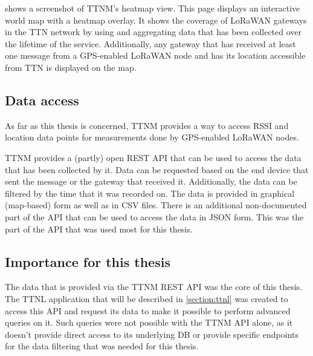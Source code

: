  shows a screenshot of \acl{TTNM}'s heatmap view.
This page displays an interactive world map with a heatmap overlay.
It shows the coverage of \ac{LoRaWAN} gateways in the \ac{TTN} network by using and aggregating data that has been collected over the lifetime of the service.
Additionally, any gateway that has received at least one message from a \ac{GPS}-enabled \ac{LoRaWAN} node and has its location accessible from \ac{TTN} is displayed on the map.

\subsection{Data access}

As far as this thesis is concerned, \acl{TTNM} provides a way to access \ac{RSSI} and location data points for measurements done by \ac{GPS}-enabled \ac{LoRaWAN} nodes.

\ac{TTNM} provides a (partly) open \ac{REST} \ac{API} that can be used to access the data that has been collected by it.
Data can be requested based on the end device that sent the message or the gateway that received it.
Additionally, the data can be filtered by the time that it was recorded on.
The data is provided in graphical (map-based) form as well as in \ac{CSV} files.
There is an additional non-documented part of the \ac{API} that can be used to access the data in \ac{JSON} form.
This was the part of the \ac{API} that was used most for this thesis.

\subsection{Importance for this thesis}

The data that is provided via the \ac{TTNM} \ac{REST} \ac{API} was the core of this thesis.
The \ac{TTNL} application that will be described in \cref{section:ttnl} was created to access this \ac{API} and request its data to make it possible to perform advanced queries on it.
Such queries were not possible with the \ac{TTNM} \ac{API} alone, as it doesn't provide direct access to its underlying \ac{DB} or provide specific endpoints for the data filtering that was needed for this thesis.